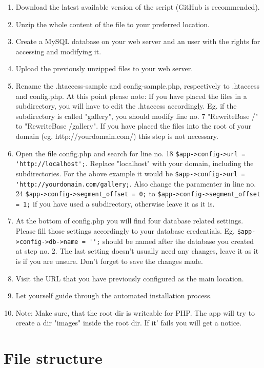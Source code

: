 \documentclass[a4paper,12pt,oneside]{article} %
\begin{document}
\begin{enumerate}
\item Download the latest available version of the script (GitHub is recommended).
\item Unzip the whole content of the file to your preferred location.
\item Create a MySQL database on your web server and an user with the rights for accessing and modifying it.
\item Upload the previously unzipped files to your web server.
\item Rename the .htaccess-sample and config-sample.php, respectively to .htaccess and config.php.
At this point please note: If you have placed the files in a subdirectory, you will have to edit the .htaccess accordingly.
Eg. if the subdirectory is called "gallery", you should modify line no. 7 "RewriteBase /" to "RewriteBase /gallery".
If you have placed the files into the root of your domain (eg. http://yourdomain.com/) this step is not necessary.
\item Open the file config.php and search for line no. 18 \lstinline{$app->config->url = 'http://localhost';}. Replace "localhost" with
your domain, including the subdirectories. For the above example it would be \lstinline{$app->config->url = 'http://yourdomain.com/gallery;}.
Also change the paramenter in line no. 24 \lstinline{$app->config->segment_offset = 0;} to \lstinline{$app->config->segment_offset = 1;} if you have used a subdirectory, otherwise leave it as it is.
\item At the bottom of config.php you will find four database related settings. Please fill those settings accordingly to your database credentials.
Eg. \lstinline{$app->config->db->name = '';} should be named after the database you created at step no. 2.
The last setting doesn't usually need any changes, leave it as it is if you are unsure. Don't forget to save the changes made.
\item Visit the URL that you have previously configured as the main location.
\item Let yourself guide through the automated installation process.
\item Note: Make sure, that the root dir is writeable for PHP. The app will try to create a dir "images" inside the root dir. If it' fails you will get a notice.
\end{enumerate}


\newpage

\section{File structure}
\end{document}
